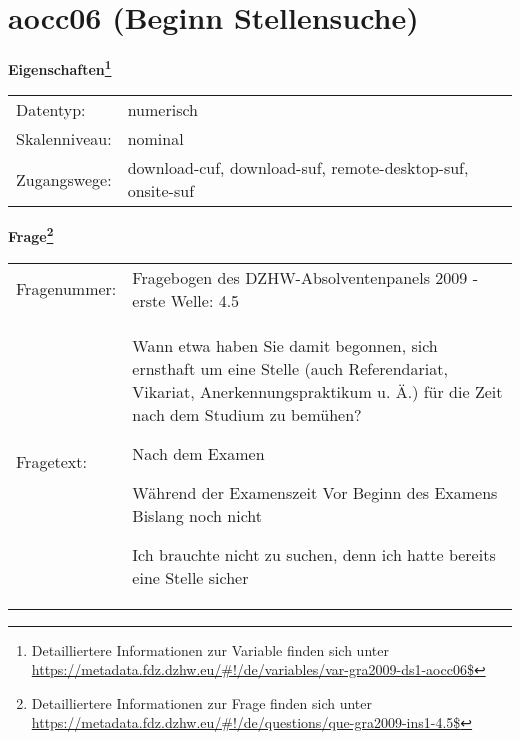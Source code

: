 
    \setcounter{footnote}{0}

    \vspace*{-1.8cm}
	\section{aocc06 (Beginn Stellensuche)}
	\label{section:aocc06}



    \vspace*{0.5cm}
    \noindent\textbf{Eigenschaften\footnote{Detailliertere Informationen zur Variable finden sich unter
		\url{https://metadata.fdz.dzhw.eu/\#!/de/variables/var-gra2009-ds1-aocc06$}}}\\
	\begin{tabularx}{\hsize}{@{}lX}
	Datentyp: & numerisch \\
	Skalenniveau: & nominal \\
	Zugangswege: &
	  download-cuf, 
	  download-suf, 
	  remote-desktop-suf, 
	  onsite-suf
 \\
    \end{tabularx}



				\vspace*{0.5cm}
                \noindent\textbf{Frage\footnote{Detailliertere Informationen zur Frage finden sich unter
		              \url{https://metadata.fdz.dzhw.eu/\#!/de/questions/que-gra2009-ins1-4.5$}}}\\
				\begin{tabularx}{\hsize}{@{}lX}
					Fragenummer: &
					  Fragebogen des DZHW-Absolventenpanels 2009 - erste Welle:
					  4.5
 \\
					Fragetext: & Wann etwa haben Sie damit begonnen, sich ernsthaft um eine Stelle (auch Referendariat, Vikariat, Anerkennungspraktikum u. Ä.) für die Zeit nach dem Studium zu bemühen?\par  Nach dem Examen\par  Während der Examenszeit Vor Beginn des Examens Bislang noch nicht\par  Ich brauchte nicht zu suchen, denn ich hatte bereits eine Stelle sicher \\
				\end{tabularx}





